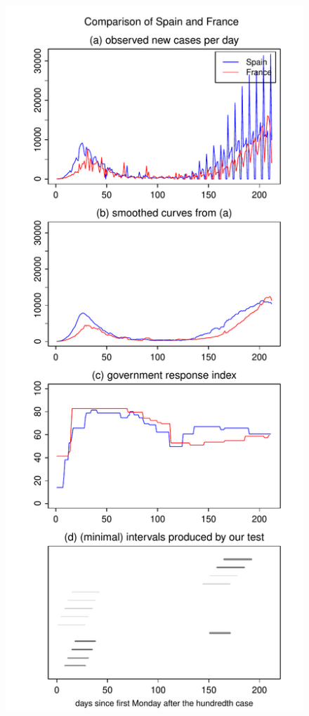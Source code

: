 \documentclass[a4paper,12pt]{article}
\numberwithin{equation}{section}
\begin{document}
\begin{figure}[p!]
\begin{minipage}[t]{0.49\textwidth}
\includegraphics[width=\textwidth]{plots/ESP_vs_FRA_long}

\end{minipage}
\end{figure}
\end{document}
